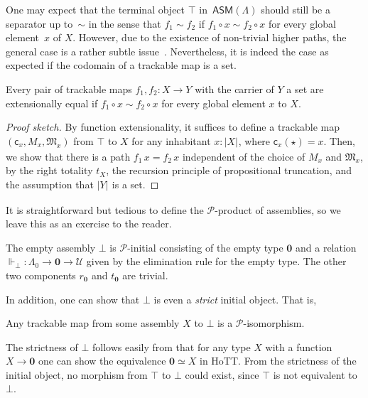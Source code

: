 \documentclass[a4paper,UKenglish,numberwithinsect,cleveref,thm-restate]{lipics-v2021}
\numberwithin{equation}{section}
\newcommand{\eqv}[2]{\ensuremath{#1 \simeq #2}\xspace}
\newcommand{\tproj}[3][]{\mathopen{}\left|#3\right|_{#2}^{#1}\mathclose{}}
\newcommand{\bproj}[1]{\tproj{}{#1}}
\newcommand{\PP}{\mathscr{P}}
\newcommand{\ASM}{\mathsf{ASM}}
\newcommand{\Univ}{\mathcal{U}}
\newcommand{\Empty}{\mathbf{0}}
\theoremstyle{plain}
\begin{document}
One may expect that the terminal object $\top$ in~$\ASM(\Lambda)$ should still be a separator up to~$\sim$ in the sense that $f_1 \sim f_2$ if $f_1 \circ x \sim f_2 \circ x$ for every global element~$x$ of $X$.
However, due to the existence of non-trivial higher paths, the general case is a rather subtle issue~\cite{Kraus2015}. 
Nevertheless, it is indeed the case as expected if the codomain of a trackable map is a set. 
\begin{proposition}
  Every pair of trackable maps $f_1, f_2 : X \to Y$ with the carrier of $Y$ a set are extensionally equal if $f_1 \circ x \sim f_2 \circ x$ for every global element $x$ to $X$. 
\end{proposition}
\begin{proof}[Proof sketch]
  By function extensionality, it suffices to define a trackable map $(\mathsf{c}_x, M_x, \mathfrak{M}_x)$ from $\top$ to $X$ for any inhabitant $x : \bproj{X}$, where $\mathsf{c}_x(\star) = x$.
  Then, we show that there is a path $f_1\,x = f_2\,x$ independent of the choice of $M_x$ and $\mathfrak{M}_x$, by the right totality $t_X$, the recursion principle of propositional truncation, and the assumption that $\bproj{Y}$ is a set. 
\end{proof}

It is straightforward but tedious to define the $\PP$-product of assemblies, so we leave this as an exercise to the reader. 
\begin{example}
The empty assembly $\bot$ is $\PP$-initial consisting of the empty type $\Empty$ and a relation $\Vdash_\bot : \Lambda_0 \to \Empty \to \Univ$ given by the elimination rule for the empty type.
The other two components $r_\Empty$ and $t_\Empty$ are trivial.
\end{example}

In addition, one can show that $\bot$ is even a \emph{strict} initial object. That is, 
\begin{proposition}\label{prop:strict-initial}
  Any trackable map from some assembly $X$ to $\bot$ is a $\PP$-isomorphism. 
\end{proposition}
The strictness of $\bot$ follows easily from that for any type $X$ with a function $X \to \Empty$ one can show the equivalence $\eqv{\Empty}{X}$ in HoTT.
From the strictness of the initial object, no morphism from $\top$ to $\bot$ could exist, since $\top$ is not equivalent to $\bot$.
\end{document}
